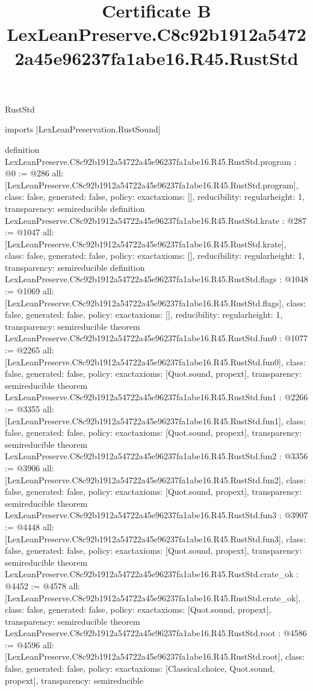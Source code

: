 \begin{lexlean}{RustStd}
\title{Certificate B LexLeanPreserve.C8c92b1912a54722a45e96237fa1abe16.R45.RustStd}
\begin{coremodule}
imports [LexLeanPreservation.RustSound]

definition LexLeanPreserve.C8c92b1912a54722a45e96237fa1abe16.R45.RustStd.program : @0 := @286 {
  all: [LexLeanPreserve.C8c92b1912a54722a45e96237fa1abe16.R45.RustStd.program],
  class: false,
  generated: false,
  policy: exact{axioms: []},
  reducibility: regular{height: 1},
  transparency: semireducible
}
definition LexLeanPreserve.C8c92b1912a54722a45e96237fa1abe16.R45.RustStd.krate : @287 := @1047 {
  all: [LexLeanPreserve.C8c92b1912a54722a45e96237fa1abe16.R45.RustStd.krate],
  class: false,
  generated: false,
  policy: exact{axioms: []},
  reducibility: regular{height: 1},
  transparency: semireducible
}
definition LexLeanPreserve.C8c92b1912a54722a45e96237fa1abe16.R45.RustStd.flags : @1048 := @1069 {
  all: [LexLeanPreserve.C8c92b1912a54722a45e96237fa1abe16.R45.RustStd.flags],
  class: false,
  generated: false,
  policy: exact{axioms: []},
  reducibility: regular{height: 1},
  transparency: semireducible
}
theorem LexLeanPreserve.C8c92b1912a54722a45e96237fa1abe16.R45.RustStd.fun0 : @1077 := @2265 {
  all: [LexLeanPreserve.C8c92b1912a54722a45e96237fa1abe16.R45.RustStd.fun0],
  class: false,
  generated: false,
  policy: exact{axioms: [Quot.sound, propext]},
  transparency: semireducible
}
theorem LexLeanPreserve.C8c92b1912a54722a45e96237fa1abe16.R45.RustStd.fun1 : @2266 := @3355 {
  all: [LexLeanPreserve.C8c92b1912a54722a45e96237fa1abe16.R45.RustStd.fun1],
  class: false,
  generated: false,
  policy: exact{axioms: [Quot.sound, propext]},
  transparency: semireducible
}
theorem LexLeanPreserve.C8c92b1912a54722a45e96237fa1abe16.R45.RustStd.fun2 : @3356 := @3906 {
  all: [LexLeanPreserve.C8c92b1912a54722a45e96237fa1abe16.R45.RustStd.fun2],
  class: false,
  generated: false,
  policy: exact{axioms: [Quot.sound, propext]},
  transparency: semireducible
}
theorem LexLeanPreserve.C8c92b1912a54722a45e96237fa1abe16.R45.RustStd.fun3 : @3907 := @4448 {
  all: [LexLeanPreserve.C8c92b1912a54722a45e96237fa1abe16.R45.RustStd.fun3],
  class: false,
  generated: false,
  policy: exact{axioms: [Quot.sound, propext]},
  transparency: semireducible
}
theorem LexLeanPreserve.C8c92b1912a54722a45e96237fa1abe16.R45.RustStd.crate_ok : @4452 := @4578 {
  all: [LexLeanPreserve.C8c92b1912a54722a45e96237fa1abe16.R45.RustStd.crate_ok],
  class: false,
  generated: false,
  policy: exact{axioms: [Quot.sound, propext]},
  transparency: semireducible
}
theorem LexLeanPreserve.C8c92b1912a54722a45e96237fa1abe16.R45.RustStd.root : @4586 := @4596 {
  all: [LexLeanPreserve.C8c92b1912a54722a45e96237fa1abe16.R45.RustStd.root],
  class: false,
  generated: false,
  policy: exact{axioms: [Classical.choice, Quot.sound, propext]},
  transparency: semireducible
}


\end{coremodule}
\end{lexlean}
